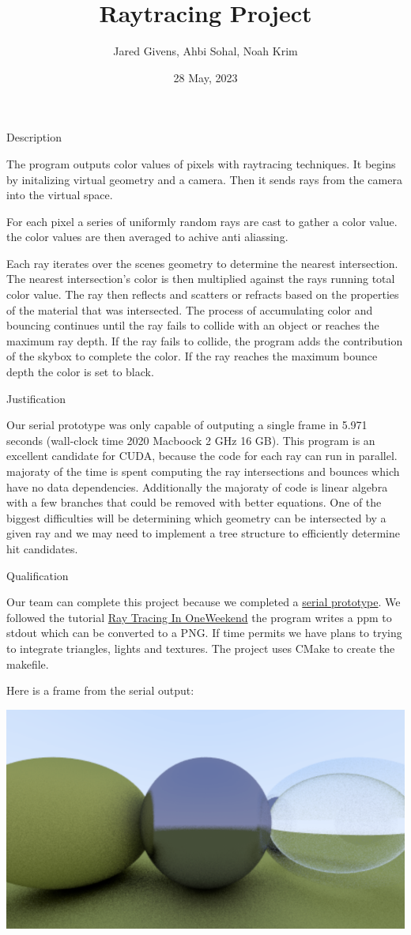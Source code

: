 \documentclass{article}
\title{Raytracing Project}
\author{Jared Givens, Ahbi Sohal, Noah Krim}
\date{28 May, 2023}
\begin{document}
\maketitle

\large
Description

\normalsize
The program outputs color values of pixels with raytracing techniques. 
It begins by initalizing virtual geometry and a camera. Then it sends rays from the camera 
into the virtual space. 

For each pixel a series of uniformly random rays are 
cast to gather a color value. the color values are then averaged to achive anti 
aliassing. 

Each ray iterates over the scenes geometry to determine the nearest 
intersection. The nearest intersection's color is then multiplied against the 
rays running total color value. The ray then reflects and scatters or refracts 
based on the properties of the material that was intersected. The process of 
accumulating color and bouncing continues until the ray fails to collide with 
an object or reaches the maximum ray depth. If the ray fails to collide, the 
program adds the contribution of the skybox to complete the color.  
If the ray reaches the 
maximum bounce depth the color is set to black.  

\large
Justification

\normalsize
Our serial prototype was only capable of outputing a single frame in 5.971 seconds
(wall-clock time 2020 Macboock 2 GHz 16 GB). This program is an excellent 
candidate for CUDA, because the code for each ray can run in parallel. 
majoraty of the time is spent computing the ray intersections and bounces which 
have no data dependencies. Additionally the majoraty of code is linear algebra 
with a few branches that could be removed with better equations.  One of the 
biggest difficulties will be determining which geometry can be intersected by a 
given ray and we may need to implement a tree structure to efficiently determine
hit candidates.

\large
Qualification

\normalsize
Our team can complete this project because we completed a 
\href{https://github.com/JaredGivens/ECS158-Raytracing}{serial prototype}.
We followed the tutorial
\href{https://raytracing.github.io/books/RayTracingInOneWeekend.html}{Ray Tracing In OneWeekend}
the program writes a ppm to stdout which can be converted to a PNG.
If time permits we have plans to trying to integrate triangles, lights
and textures.  The project uses CMake to create the makefile.

Here is a frame from the serial output:

\includegraphics[scale=0.5]{rtsc}
\end{document}
